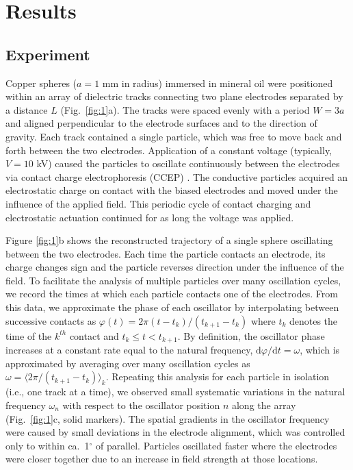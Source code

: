 \section{Results}

\subsection{Experiment}

Copper spheres ($a = 1$ mm in radius) immersed in mineral oil were positioned within an array of dielectric tracks connecting two plane electrodes separated by a distance $L$ (Fig.~\ref{fig:1}a). The tracks were spaced evenly with a period $W=3a$ and aligned perpendicular to the electrode surfaces and to the direction of gravity. Each track contained a single particle, which was free to move back and forth between the two electrodes. Application of a constant voltage (typically, $V=10$ kV) caused the particles to oscillate continuously between the electrodes via contact charge electrophoresis (CCEP) \autocite{bishop2018contact, drews2015contact}. The conductive particles acquired an electrostatic charge on contact with the biased electrodes and moved under the influence of the applied field. This periodic cycle of contact charging and electrostatic actuation continued for as long the voltage was applied.


Figure \ref{fig:1}b shows the reconstructed trajectory of a single sphere oscillating between the two electrodes. Each time the particle contacts an electrode, its charge changes sign and the particle reverses direction under the influence of the field. To facilitate the analysis of multiple particles over many oscillation cycles, we record the times at which each particle contacts one of the electrodes.  From this data, we approximate the phase of each oscillator by interpolating between successive contacts as $\varphi(t) = 2\pi (t-t_k)/ (t_{k+1}-t_{k})$ where $t_k$ denotes the time of the $k^{th}$ contact and $t_k \leq t < t_{k+1}$. By definition, the oscillator phase increases at a constant rate equal to the natural frequency, $\mathrm{d}\varphi/\mathrm{d}t = \omega$, which is approximated by averaging over many oscillation cycles as $\omega = \langle 2\pi/(t_{k+1}-t_{k}) \rangle_k$. Repeating this analysis for each particle in isolation (i.e., one track at a time), we observed small systematic variations in the natural frequency $\omega_n$ with respect to the oscillator position $n$ along the array (Fig.~\ref{fig:1}c, solid markers). The spatial gradients in the oscillator frequency were caused by small deviations in the electrode alignment,  which was controlled only to within ca.~1$^\circ$ of parallel. Particles oscillated faster where the electrodes were closer together due to an increase in field strength at those locations.
        
